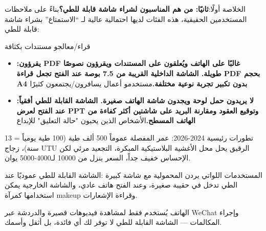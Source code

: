 


الخلاصة أولًا:\textbf{ثانيًا: من هم المناسبون لشراء شاشة قابلة للطي؟}بناءً على ملاحظات المستخدمين الحقيقية، هذه الفئات لديها احتمالية عالية لـ “الاستمتاع” بشراء شاشة قابلة للطي:

قراء/معالجو مستندات بكثافة

\begin{itemize}
  \item \textbf{:يقرؤون PDF غالبًا على الهاتف ويُعلقون على المستندات ويقرؤون نصوصًا طويلة. الشاشة الداخلية القريبة من 7.5 بوصة عند الفتح تجعل قراءة PDF بحجم A4 بدون تكبير تجربة نوعية مختلفة.}مستخدمو أعمال يسافرون/يجتمعون كثيرًا
  \item \textbf{:لا يريدون حمل لوحة ويجدون شاشة الهاتف صغيرة. الشاشة القابلة للطي أفقياً عند الفتح لعرض PPT وتوقيع العقود ومقارنة البريد على شاشتين أكثر كفاءة من الهاتف المسطح.}الأشخاص الذين يحبون "حالة التعليق" للإبداع
\end{itemize}

تطورات رئيسية 2024-2026: عمر المفصلة عموماً 500 ألف طية (100 طية يومياً = 13 سنة)، زجاج UTU الرقيق يحل محل الأغشية البلاستيكية المبكرة، التجعيد مرئي لكن الإحساس خفيف جداً، السعر ينزل من 10000 لـ4000-5000 يوان.

\begin{tcbinfo}{المستخدمات اللواتي يردن المحمولية مع شاشة كبيرة}
:الشاشة القابلة للطي عموديًا عند الطي تدخل في حقيبة صغيرة، وعند الفتح هاتف عادي، والشاشة الخارجية يمكن استخدامها كمرآة makeup وقراءة الإشعارات.

\end{tcbinfo}


الهاتف يُستخدم فقط لمشاهدة فيديوهات قصيرة والدردشة عبر WeChat وإجراء المكالمات — الشاشة القابلة للطي لا توفر لك أي فائدة، بل أثقل وأسمك.

